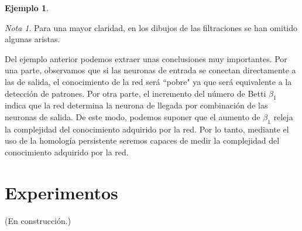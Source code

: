 \documentclass[12pt]{article}
\numberwithin{equation}{section}
\theoremstyle{definition}
\newtheorem{ejem}{Ejemplo}
\theoremstyle{remark}
\newtheorem*{remark}{Nota}
\theoremstyle{plain}
\begin{document}
\begin{ejem}
\begin{figure}[H]
\begin{figure}[H]
					\end{figure}
				\endminipage
					\begin{figure}[H]
					\end{figure}
				\endminipage
			\end{figure}
			\begin{remark}
				Para una mayor claridad, en los dibujos de las filtraciones se han omitido algunas aristas.
			\end{remark}
		\end{ejem}	
		Del ejemplo anterior podemos extraer unas conclusiones muy importantes. Por una parte, observamos que si las neuronas de entrada se conectan
		directamente a las de salida, el conocimiento de la red será ``pobre" ya que será equivalente a la detección de patrones. Por otra parte,
		el incremento del número de Betti $\beta_{1}$ indica que la red determina la neurona de llegada por combinación de las neuronas de salida. De este modo,
		podemos suponer que el aumento de $\beta_{1}$ releja la complejidad del conocimiento adquirido por la red. Por lo tanto, mediante el uso de la homología persistente
		seremos capaces de medir la complejidad del conocimiento adquirido por la red.
	
	\section{Experimentos}
		(En construcción.)
\end{document}
